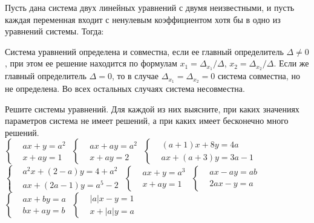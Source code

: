 \begin{problems}

\item
Пусть дана система двух линейных уравнений с двумя неизвестными, и пусть каждая
переменная входит с ненулевым коэффициентом хотя бы в одно из уравнений системы.
Тогда:\par\smallskip
Система уравнений определена и совместна,
если ее главный определитель $\Delta \not= 0$, при этом ее решение находится
по формулам
$x_1 = \Delta_{x_1} / \Delta$,
$x_2 = \Delta_{x_2} / \Delta$.
Если же главный определитель $\Delta = 0$, то в случае
$\Delta_{x_1} = \Delta_{x_2} = 0$ система совместна, но не определена.
Во всех остальных случаях система несовместна.

\item
Решите системы уравнений.
Для каждой из них выясните, при каких значениях параметров система не имеет
решений, а при каких имеет бесконечно много решений.\\[1ex]
\sbp
\(\left\{\begin{aligned}
&   a x + y = a^2
\\
&   x + a y = 1
\end{aligned}\right.\)
\qquad
\sbp
\(\left\{\begin{aligned}
&   a x + a y = a^2
\\
&   x + a y = 2
\end{aligned}\right.\)
\qquad
\sbp
\(\left\{\begin{aligned}
&   (a + 1) x + 8 y = 4 a
\\
&   a x + (a + 3) y = 3 a - 1
\end{aligned}\right.\)
\\[1ex]
\sbp
\(\left\{\begin{aligned}
&   a^2 x + (2 - a) y = 4 + a^2
\\
&   a x + (2 a - 1) y = a^5 - 2
\end{aligned}\right.\)
\qquad
\sbp
\(\left\{\begin{aligned}
&   a x + y = a^3
\\
&   x + a y = 1
\end{aligned}\right.\)
\qquad
\sbp
\(\left\{\begin{aligned}
&   a x - a y = a b
\\
&   2 a x - y = a
\end{aligned}\right.\)
\\[1ex]
\sbp
\(\left\{\begin{aligned}
&   a x + b y = a
\\
&   b x + a y = b
\end{aligned}\right.\)
\qquad
\sbp
\(\left\{\begin{aligned}
&   |a| x - y = 1
\\
&   x + |a| y = a
\end{aligned}\right.\)
\vspace{1ex}

\end{problems}

